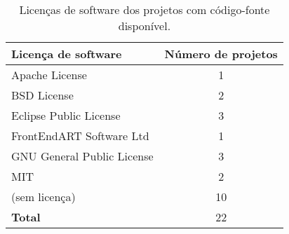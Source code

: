 \begin{table}[hbt]
\caption{Licenças de software dos projetos com código-fonte disponível.}
\centering
\begin{tabular}{ l c }
  \hline
  {\bf Licença de software} & {\bf Número de projetos} \\
  \hline
  Apache License & 1 \\
  BSD License & 2 \\
  Eclipse Public License & 3 \\
  FrontEndART Software Ltd & 1 \\
  GNU General Public License & 3 \\
  MIT & 2 \\
  (sem licença) & 10 \\
  \hline
  {\bf Total} & 22 \\
  \hline
\end{tabular}
\label{license-table}
\end{table}
